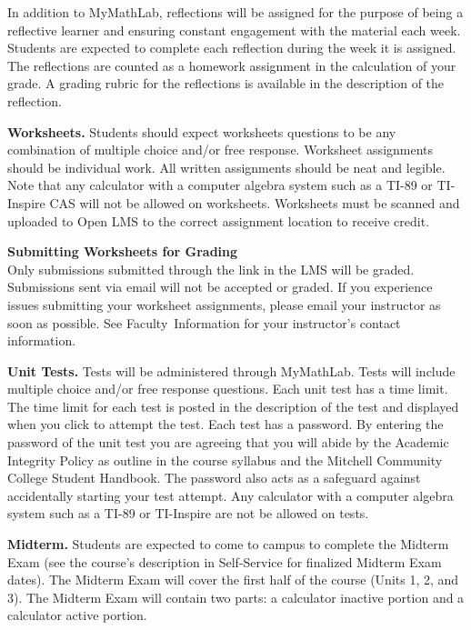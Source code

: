 \documentclass[11pt]{article}
\renewenvironment{framed}[1][]{%
  \def\FrameCommand{%
    \hspace{1pt}%
    {\color{mybordercolor}\vrule width 2pt} %
    \hspace{1pt}%
    \fboxsep=\FrameSep%
    \colorbox{mybgcolor}%
  }%
  \MakeFramed {\advance\hsize-\width \FrameRestore}%
}{%
  \endMakeFramed
}
\begin{document}
In addition to MyMathLab, reflections will be assigned for the purpose of being a reflective learner and ensuring constant engagement with the material each week. Students are expected to complete each reflection during the week it is assigned. The reflections are counted as a homework assignment in the calculation of your grade. A grading rubric for the reflections is available in the description of the reflection.

\textbf{Worksheets.} Students should expect worksheets questions to be any combination of multiple choice and/or free response. Worksheet assignments should be individual work. All written assignments should be neat and legible. Note that any calculator with a computer algebra system such as a TI-89 or TI-Inspire CAS will not be allowed on worksheets. Worksheets must be scanned and uploaded to Open LMS to the correct assignment location to receive credit.

\begin{framed}
\textbf{Submitting Worksheets for Grading}\\
Only submissions submitted through the link in the LMS will be graded. Submissions sent via email will not be accepted or graded. If you experience issues submitting your worksheet assignments, please email your instructor as soon as possible. See Faculty~Information for your instructor's contact information.
\end{framed}

\textbf{Unit Tests.} Tests will be administered through MyMathLab. Tests will include multiple choice and/or free response questions. Each unit test has a time limit. The time limit for each test is posted in the description of the test and displayed when you click to attempt the test. Each test has a password. By entering the password of the unit test you are agreeing that you will abide by the Academic Integrity Policy as outline in the course syllabus and the Mitchell Community College Student Handbook. The password also acts as a safeguard against accidentally starting your test attempt. Any calculator with a computer algebra system such as a TI-89 or TI-Inspire are not be allowed on tests.

\textbf{Midterm.} Students are expected to come to campus to complete the Midterm Exam (see the course's description in Self-Service for finalized Midterm Exam dates). The Midterm Exam will cover the first half of the course (Units 1, 2, and 3). The Midterm Exam will contain two parts: a calculator inactive portion and a calculator active portion.
\end{document}
